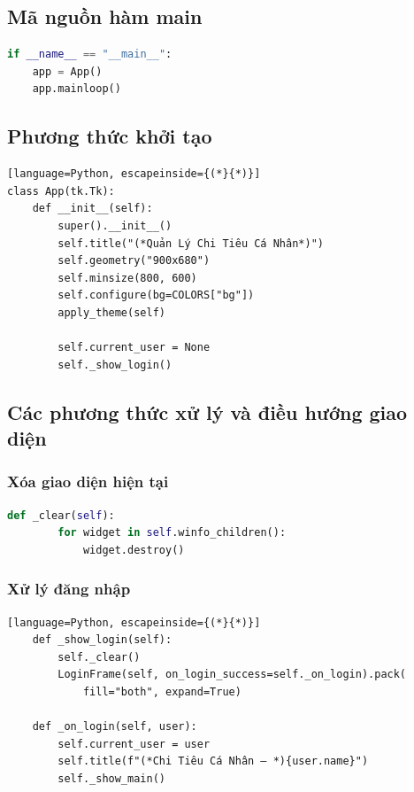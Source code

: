 \documentclass[12pt,letterpaper]{article}
\begin{document}
\subsection{Mã nguồn hàm main}
\begin{lstlisting}[language=Python]
if __name__ == "__main__":
    app = App()
    app.mainloop()
\end{lstlisting}
\subsection{Phương thức khởi tạo}
\begin{lstlisting}[language=Python, escapeinside={(*}{*)}]
class App(tk.Tk):
    def __init__(self):
        super().__init__()
        self.title("(*Quản Lý Chi Tiêu Cá Nhân*)")
        self.geometry("900x680")
        self.minsize(800, 600)
        self.configure(bg=COLORS["bg"])
        apply_theme(self)

        self.current_user = None
        self._show_login()
\end{lstlisting}
\subsection{Các phương thức xử lý và điều hướng giao diện}
\subsubsection{Xóa giao diện hiện tại}
\begin{lstlisting}[language=Python]
    def _clear(self):
        for widget in self.winfo_children():
            widget.destroy()
\end{lstlisting}
\subsubsection{Xử lý đăng nhập}
\begin{lstlisting}[language=Python, escapeinside={(*}{*)}]
    def _show_login(self):
        self._clear()
        LoginFrame(self, on_login_success=self._on_login).pack(
            fill="both", expand=True)

    def _on_login(self, user):
        self.current_user = user
        self.title(f"(*Chi Tiêu Cá Nhân — *){user.name}")
        self._show_main()
\end{lstlisting}
\end{document}

